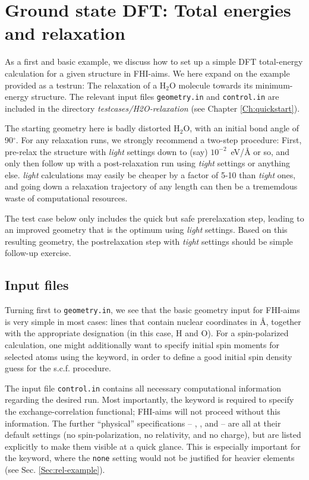 \section{Ground state DFT: Total energies and relaxation}
\label{Sec:example-Etot}

As a first and basic example, we discuss how to set up a simple
DFT total-energy calculation for a given structure in
FHI-aims. We here expand on the example provided as a testrun: The
relaxation of a H$_2$O molecule towards its
minimum-energy structure. The relevant input files
\texttt{geometry.in} and \texttt{control.in} are included in the
directory \emph{testcases/H2O-relaxation} (see Chapter
\ref{Ch:quickstart}).  

The starting geometry here is badly distorted H$_2$O, with an initial bond
angle of 90$^\circ$. For any relaxation runs, we strongly recommend a two-step
procedure: First, pre-relax the structure with \emph{light} settings down to
(say) $10^{-2}$~eV/{\AA} or so, and only then follow up with a post-relaxation
run using \emph{tight} settings or anything else. \emph{light} calculations
may easily be cheaper by a factor of 5-10 than \emph{tight} ones, and going
down a relaxation trajectory of any length can then be a trememdous waste of
computational resources. 

The test case below only includes the quick but safe prerelaxation step, 
leading to an improved geometry that is
the optimum using \emph{light} settings. Based on this resulting geometry, the
postrelaxation step with \emph{tight} settings should be simple follow-up
exercise.

\subsection*{Input files}

Turning first to \texttt{geometry.in}, we see that the basic geometry
input for FHI-aims is very simple in most cases:  lines
that contain nuclear coordinates in {\AA}, together with the appropriate
 designation (in this case, H and O). For a spin-polarized
calculation, one might additionally want to specify initial spin moments for
selected atoms using the  keyword, in order to define
a good initial spin density guess for the s.c.f. procedure.

The input file \texttt{control.in} contains all necessary
computational information regarding the desired run. Most importantly,
the  keyword is required to specify the
exchange-correlation functional; FHI-aims will not proceed
without this information. The further ``physical'' specifications -- ,
, and  -- are all at their
default settings (no spin-polarization, no relativity, and no charge),
but are listed explicitly to make them visible at a quick glance. This
is especially important for the  keyword, where
the \texttt{none} setting would not be justified
for heavier elements (see Sec. \ref{Sec:rel-example}).

